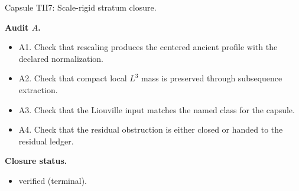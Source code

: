 \documentclass[11pt]{amsart}
\newcommand{\capsulefield}[1]{\par\smallskip\noindent\textbf{#1.}\ }
\begin{document}
\begin{proofcapsule}{Capsule TII7: Scale-rigid stratum closure.}
  \capsulefield{Audit \(A\)}
  \begin{itemize}[leftmargin=1.8em]
  \item A1. Check that rescaling produces the centered ancient profile with the declared normalization.
  \item A2. Check that compact local $L^3$ mass is preserved through subsequence extraction.
  \item A3. Check that the Liouville input matches the named class for the capsule.
  \item A4. Check that the residual obstruction is either closed or handed to the residual ledger.
  \end{itemize}
  \capsulefield{Closure status}
  \begin{itemize}[leftmargin=1.8em]
  \item verified (terminal).
  \end{itemize}
\end{proofcapsule}
\end{document}

